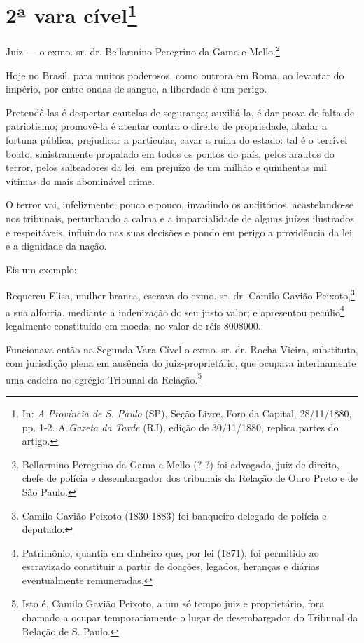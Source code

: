 \chapter{2ª vara cível\footnote[*]{In: \emph{A Província de S. Paulo}
  (SP), Seção Livre, Foro da Capital, 28/11/1880, pp. 1-2. A
  \emph{Gazeta da Tarde} (RJ)\emph{,} edição de 30/11/1880, replica
  partes do artigo.}}


Juiz --- o exmo. sr. dr. Bellarmino Peregrino da Gama e
Mello.\footnote{Bellarmino Peregrino da Gama e Mello (?-?) foi
  advogado, juiz de direito, chefe de polícia e desembargador dos
  tribunais da Relação de Ouro Preto e de São Paulo.}

Hoje no Brasil, para muitos poderosos, como outrora em Roma, ao levantar
do império, por entre ondas de sangue, a liberdade é um perigo.

Pretendê-las é despertar cautelas de segurança; auxiliá-la, é dar prova
de falta de patriotismo; promovê-la é atentar contra o direito de
propriedade, abalar a fortuna pública, prejudicar a particular, cavar a
ruína do estado: tal é o terrível boato, sinistramente propalado em
todos os pontos do país, pelos arautos do terror, pelos salteadores da
lei, em prejuízo de um milhão e quinhentas mil vítimas do mais
abominável crime.

O terror vai, infelizmente, pouco e pouco, invadindo os auditórios,
acastelando-se nos tribunais, perturbando a calma e a imparcialidade de
alguns juízes ilustrados e respeitáveis, influindo nas suas decisões e
pondo em perigo a providência da lei e a dignidade da nação.

Eis um exemplo:

Requereu Elisa, mulher branca, escrava do exmo. sr. dr. Camilo Gavião
Peixoto,\footnote{Camilo Gavião Peixoto (1830-1883) foi banqueiro
  delegado de polícia e deputado.} a sua alforria, mediante a
indenização do seu justo valor; e apresentou pecúlio\footnote{
  Patrimônio, quantia em dinheiro que, por lei (1871), foi permitido ao
  escravizado constituir a partir de doações, legados, heranças e
  diárias eventualmente remuneradas.} legalmente constituído em moeda,
no valor de réis 800\$000.

Funcionava então na Segunda Vara Cível o exmo. sr. dr. Rocha Vieira,
substituto, com jurisdição plena em ausência do juiz-proprietário, que
ocupava interinamente uma cadeira no egrégio Tribunal da
Relação.\footnote{Isto é, Camilo Gavião Peixoto, a um só tempo juiz e
  proprietário, fora chamado a ocupar temporariamente o lugar de
  desembargador do Tribunal da Relação de S. Paulo.}

